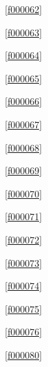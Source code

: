 \noindent\filesourcenumbernameone\ \ref{f000062}\dotfill\pageref{f000062}%

\noindent\filesourcenumbernameone\ \ref{f000063}\dotfill\pageref{f000063}%

\noindent\filesourcenumbernameone\ \ref{f000064}\dotfill\pageref{f000064}%

\noindent\filesourcenumbernameone\ \ref{f000065}\dotfill\pageref{f000065}%

\noindent\filesourcenumbernameone\ \ref{f000066}\dotfill\pageref{f000066}%

\noindent\filesourcenumbernameone\ \ref{f000067}\dotfill\pageref{f000067}%

\noindent\filesourcenumbernameone\ \ref{f000068}\dotfill\pageref{f000068}%

\noindent\filesourcenumbernameone\ \ref{f000069}\dotfill\pageref{f000069}%

\noindent\filesourcenumbernameone\ \ref{f000070}\dotfill\pageref{f000070}%

\noindent\filesourcenumbernameone\ \ref{f000071}\dotfill\pageref{f000071}%

\noindent\filesourcenumbernameone\ \ref{f000072}\dotfill\pageref{f000072}%

\noindent\filesourcenumbernameone\ \ref{f000073}\dotfill\pageref{f000073}%

\noindent\filesourcenumbernameone\ \ref{f000074}\dotfill\pageref{f000074}%

\noindent\filesourcenumbernameone\ \ref{f000075}\dotfill\pageref{f000075}%

\noindent\filesourcenumbernameone\ \ref{f000076}\dotfill\pageref{f000076}%

\noindent\filesourcenumbernameone\ \ref{f000080}\dotfill\pageref{f000080}%









